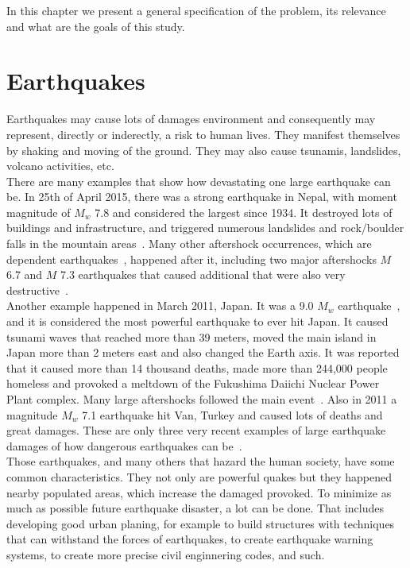 In this chapter we present a general specification of the problem, its relevance and what are the goals of this study.

\section{Earthquakes}
Earthquakes may cause lots of damages environment and consequently may represent, directly or inderectly, a risk to human lives. They manifest themselves by shaking and moving of the ground. They may also cause tsunamis, landslides, volcano activities, etc.\\

There are many examples that show how devastating one large earthquake can be. In 25th of April 2015, there was a strong earthquake in Nepal, with moment magnitude of $M_w$ 7.8 and considered the largest since 1934. It destroyed lots of buildings and
infrastructure, and triggered numerous landslides and rock/boulder falls in the mountain areas~\cite{wilkinson20152015}. Many other aftershock occurrences, which are dependent earthquakes~\cite{van2012seismicity}, happened after it, including two major aftershocks $M$ 6.7 and $M$ 7.3 earthquakes that caused additional that were also very destructive~\cite{wilkinson20152015}.\\

Another example happened in March 2011, Japan. It was a 9.0 $M_w$ earthquake~\cite{simons20112011}, and it is considered the most powerful earthquake to ever hit Japan. It caused tsunami waves that reached more than 39 meters, moved the main island in Japan more than 2 meters east and also changed the Earth axis. It was reported that it caused more than 14 thousand deaths, made more than 244,000 people homeless and provoked a meltdown of the Fukushima Daiichi Nuclear Power Plant complex. Many large aftershocks followed the main event~\cite{mimura2011damage}. Also in 2011 a magnitude $M_w$ 7.1 earthquake hit Van, Turkey and caused lots of deaths and great damages. These are only three very recent examples of large earthquake damages of how dangerous earthquakes can be~\cite{irmak2012source}.\\

Those earthquakes, and many others that hazard the human society, have some common characteristics. They not only are powerful quakes but they happened nearby populated areas, which increase the damaged provoked. To minimize as much as possible future earthquake disaster, a lot can be done. That includes developing good urban planing, for example to build structures with techniques that can withstand the forces of earthquakes, to create earthquake warning systems, to create more precise civil enginnering codes, and such.\\

